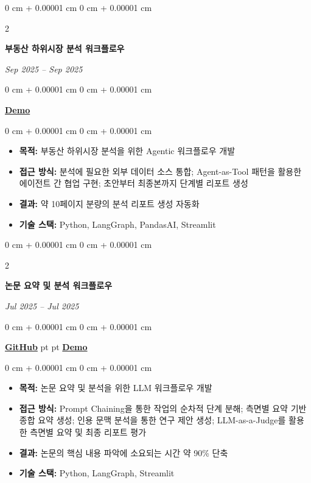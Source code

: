 \documentclass[10pt, letterpaper]{article}
\newenvironment{highlights}{
    \begin{itemize}[
        topsep=0.10 cm,
        parsep=0.10 cm,
        partopsep=0pt,
        itemsep=0pt,
        leftmargin=0 cm + 10pt
    ]
}{
    \end{itemize}
} %
\newenvironment{onecolentry}{
    \begin{adjustwidth}{
        0 cm + 0.00001 cm
    }{
        0 cm + 0.00001 cm
    }
}{
    \end{adjustwidth}
} %
\newenvironment{twocolentry}[2][]{
    \onecolentry
    \def\secondColumn{\textit{#2}}
    \setcolumnwidth{\fill, 4.5 cm}
    \begin{paracol}{2}
}{
    \switchcolumn \raggedleft \secondColumn
    \end{paracol}
    \endonecolentry
} %
\begin{document}
        \vspace{0.2 cm}
        \begin{twocolentry}{
            Sep 2025 -- Sep 2025
        }
            \textbf{부동산 하위시장 분석 워크플로우}
        \end{twocolentry}
        \begin{onecolentry}
            \href{https://drive.google.com/file/d/1je_dNIa4m8z-_xLycZlDLBLdY-o0ZeNk/view?usp=sharing}{\textbf{Demo}}
        \end{onecolentry}

        \vspace{0.10 cm}
        \begin{onecolentry}
            \begin{highlights}
                \item \textbf{목적:} 부동산 하위시장 분석을 위한 Agentic 워크플로우 개발
                \item \textbf{접근 방식:} 분석에 필요한 외부 데이터 소스 통합; Agent-as-Tool 패턴을 활용한 에이전트 간 협업 구현; 초안부터 최종본까지 단계별 리포트 생성
                \item \textbf{결과:} 약 10페이지 분량의 분석 리포트 생성 자동화
                \item \textbf{기술 스택:} Python, LangGraph, PandasAI, Streamlit
            \end{highlights}
        \end{onecolentry}

        \vspace{0.2 cm}
        \begin{twocolentry}{
            Jul 2025 -- Jul 2025
        }
            \textbf{논문 요약 및 분석 워크플로우}
        \end{twocolentry}
        \begin{onecolentry}
            \href{https://github.com/kyoui-dev/research-paper-summarization-and-analysis}{\textbf{GitHub}}
             pt
            \AND
             pt
            \href{https://drive.google.com/file/d/1kHaHzc9Fv7R84VMxt86rZcnPEK1P3vAe/view?usp=sharing}{\textbf{Demo}}
        \end{onecolentry}

        \vspace{0.10 cm}
        \begin{onecolentry}
            \begin{highlights}
                \item \textbf{목적:} 논문 요약 및 분석을 위한 LLM 워크플로우 개발
                \item \textbf{접근 방식:} Prompt Chaining을 통한 작업의 순차적 단계 분해; 측면별 요약 기반 종합 요약 생성; 인용 문맥 분석을 통한 연구 제안 생성; LLM-as-a-Judge를 활용한 측면별 요약 및 최종 리포트 평가
                \item \textbf{결과:} 논문의 핵심 내용 파악에 소요되는 시간 약 90\% 단축
                \item \textbf{기술 스택:} Python, LangGraph, Streamlit
            \end{highlights}
        \end{onecolentry}
\end{document}
